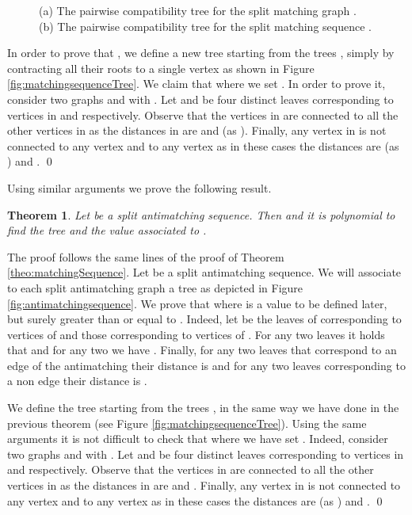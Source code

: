 \documentclass[dvipdfm]{llncs}
\newtheorem{Theorem}{Theorem}
\begin{document}
\begin{figure}[!ht]
  \begin{center}
  \end{center}
\caption{\footnotesize{(a) The pairwise compatibility tree for the split matching graph .  (b) The pairwise compatibility tree for the split matching sequence . }}
\label{fig:matchingsequence}
\end{figure}


In order to prove that ,  we define a new tree  starting from the trees , simply by contracting all their roots to a single vertex as shown in Figure \ref{fig:matchingsequenceTree}. We claim that  where we set . In order to prove it, consider two graphs  and  with . Let   and  be four distinct leaves  corresponding to vertices in  and  respectively. 
Observe that the vertices in  are connected to all the other vertices in  as the distances in  are  and  (as ). Finally, any vertex in  is not connected to any vertex  and to any vertex  as in these cases the distances are  (as ) and . \qed



\noindent
Using similar arguments we prove the following result.


\begin{Theorem}\label{theo:antimatchingSequence}
Let  be a split antimatching sequence. Then   and it is polynomial to find the tree and the value  associated to .
\end{Theorem}
\proof

The proof follows the same lines of the proof of Theorem \ref{theo:matchingSequence}. Let  be a  split antimatching sequence. We will associate to each split antimatching graph  a tree  as depicted in Figure \ref{fig:antimatchingsequence}. 
We prove that  where  is a value to be defined later, but surely greater than or equal to . Indeed, let  be the leaves of  corresponding to vertices of  and  those corresponding to vertices of . For any two leaves  it holds that  and for any two  we have . Finally, for any two leaves  that correspond to an edge of the antimatching their distance is  and for any two leaves corresponding to a non edge  their distance is . 

We define the tree  starting from the trees , in the same way we have done in the previous theorem (see Figure \ref{fig:matchingsequenceTree}). Using the same arguments it is not difficult to check that  where we have set . 
Indeed, consider two graphs  and  with . Let   and  be four distinct leaves  corresponding to vertices in  and  respectively. 
Observe that the vertices in  are connected to all the other vertices in  as the distances in  are 
 and . Finally, any vertex in  is not connected to any vertex  and to any vertex  as in these cases the distances are  (as ) and . \qed
\end{document}
